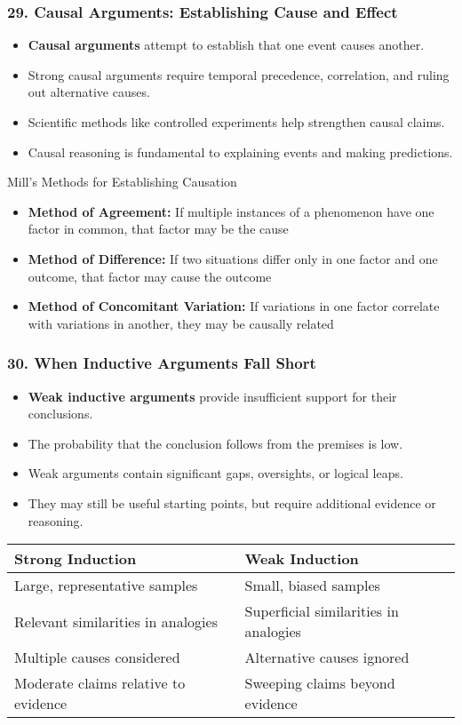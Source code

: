 \documentclass{beamer}
\begin{document}
\begin{frame}
\frametitle{29. Causal Arguments: Establishing Cause and Effect}
\begin{itemize}
\item \textbf{Causal arguments} attempt to establish that one event causes another.
\item Strong causal arguments require temporal precedence, correlation, and ruling out alternative causes.
\item Scientific methods like controlled experiments help strengthen causal claims.
\item Causal reasoning is fundamental to explaining events and making predictions.
\end{itemize}

\begin{block}{Mill's Methods for Establishing Causation}
\scriptsize
\begin{itemize}
\item \textbf{Method of Agreement:} If multiple instances of a phenomenon have one factor in common, that factor may be the cause
\item \textbf{Method of Difference:} If two situations differ only in one factor and one outcome, that factor may cause the outcome
\item \textbf{Method of Concomitant Variation:} If variations in one factor correlate with variations in another, they may be causally related
\end{itemize}
\end{block}
\end{frame}

\begin{frame}
\frametitle{30. When Inductive Arguments Fall Short}
\begin{itemize}
\item \textbf{Weak inductive arguments} provide insufficient support for their conclusions.
\item The probability that the conclusion follows from the premises is low.
\item Weak arguments contain significant gaps, oversights, or logical leaps.
\item They may still be useful starting points, but require additional evidence or reasoning.
\end{itemize}

\begin{table}
\scriptsize
\begin{tabular}{|l|l|}
\hline
\textbf{Strong Induction} & \textbf{Weak Induction} \\
\hline
Large, representative samples & Small, biased samples \\
\hline
Relevant similarities in analogies & Superficial similarities in analogies \\
\hline
Multiple causes considered & Alternative causes ignored \\
\hline
Moderate claims relative to evidence & Sweeping claims beyond evidence \\
\hline
\end{tabular}
\end{table}
\end{frame}
\end{document}
